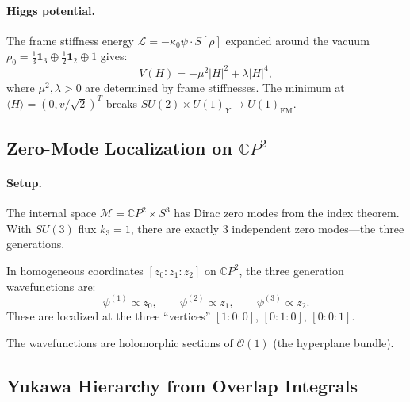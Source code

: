\paragraph{Higgs potential.}
The frame stiffness energy $\mathcal{L} = -\kappa_0\psi \cdot S[\rho]$ expanded around the vacuum $\rho_0 = \frac{1}{3}\mathbf{1}_3 \oplus \frac{1}{2}\mathbf{1}_2 \oplus 1$ gives:
\begin{equation}
V(H) = -\mu^2 |H|^2 + \lambda |H|^4,
\end{equation}
where $\mu^2, \lambda > 0$ are determined by frame stiffnesses. The minimum at $\langle H \rangle = (0, v/\sqrt{2})^T$ breaks $SU(2) \times U(1)_Y \to U(1)_{\text{EM}}$.

\subsection{Zero-Mode Localization on $\mathbb{C}P^2$}\label{app:zero-modes}

\paragraph{Setup.}
The internal space $\mathcal{M} = \mathbb{C}P^2 \times S^3$ has Dirac zero modes from the index theorem. With $SU(3)$ flux $k_3 = 1$, there are exactly 3 independent zero modes---the three generations.

\begin{proposition}\label{prop:localization}
In homogeneous coordinates $[z_0 : z_1 : z_2]$ on $\mathbb{C}P^2$, the three generation wavefunctions are:
\begin{equation}
\psi^{(1)} \propto z_0, \qquad \psi^{(2)} \propto z_1, \qquad \psi^{(3)} \propto z_2.
\end{equation}
These are localized at the three ``vertices'' $[1:0:0]$, $[0:1:0]$, $[0:0:1]$.
\end{proposition}

The wavefunctions are holomorphic sections of $\mathcal{O}(1)$ (the hyperplane bundle).

\subsection{Yukawa Hierarchy from Overlap Integrals}\label{app:yukawa-hierarchy}


